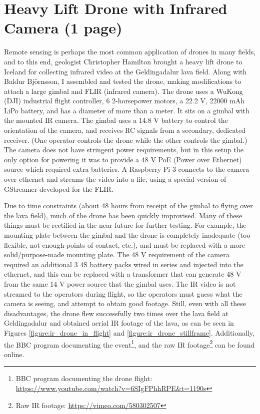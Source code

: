 \section{Heavy Lift Drone with Infrared Camera (1 page)}
\label{section:ir_drone}

Remote sensing is perhaps the most common application of drones in many fields,
and to this end, geologist Christopher Hamilton brought a heavy lift drone to Iceland for collecting infrared video
at the Geldingadalur lava field.
Along with Baldur Björnsson, I assembled and tested the drone,
making modifications to attach a large gimbal and FLIR (infrared camera).
The drone uses a WuKong (DJI) industrial flight controller,
6 2-horsepower motors,
a 22.2 V, 22000 mAh LiPo battery,
and has a diameter of more than a meter.
It sits on a gimbal with the mounted IR camera.
The gimbal uses a 14.8 V battery to control the orientation of the camera,
and receives RC signals from a secondary, dedicated receiver.
(One operator controls the drone while the other controls the gimbal.)
The camera does not have stringent power requirements,
but in this setup the only option for powering it was to provide
a 48 V PoE (Power over Ethernet) source which required extra batteries.
A Raspberry Pi 3 connects to the camera over ethernet and streams the video into a file,
using a special version of GStreamer developed for the FLIR.

Due to time constraints (about 48 hours from receipt of the gimbal
to flying over the lava field),
much of the drone has been quickly improvised.
Many of these things must be rectified in the near future for further testing.
For example, the mounting plate between the gimbal and the drone
is completely inadequate (too flexible, not enough points of contact, etc.),
and must be replaced with a more solid/purpose-made mounting plate.
The 48 V requirement of the camera required an additional 3 4S battery packs
wired in series and injected into the ethernet,
and this can be replaced with a transformer that can generate 48 V
from the same 14 V power source that the gimbal uses.
The IR video is not streamed to the operators during flight,
so the operators must guess what the camera is seeing, and attempt to obtain good footage.
Still, even with all these disadvantages, the drone flew successfully two times
over the lava field at Geldingadalur and obtained aerial IR footage of the lava,
as can be seen in Figures \ref{figure:ir_drone_in_flight} and \ref{figure:ir_drone_stillframe}.
Additionally, the BBC program documenting the event\footnote{BBC program documenting the drone flight: \url{https://www.youtube.com/watch?v=6SIgFPhhRPE&t=1190s}}, and the raw IR footage\footnote{Raw IR footage: \url{https://vimeo.com/580302507}} can be found online.

